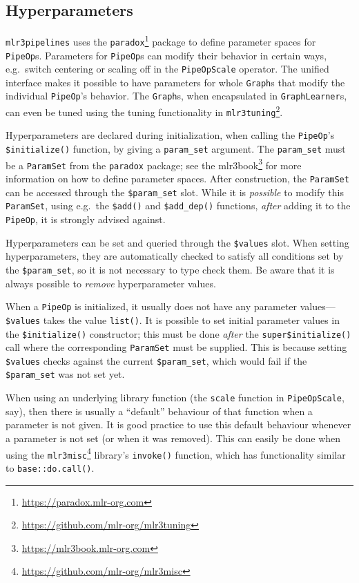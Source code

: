 \documentclass[12pt,]{scrbook}
\renewcommand{\href}[2]{#2\footnote{\url{#1}}}
\begin{document}
\hypertarget{ext-pipe-hyperpars}{%
\subsection{Hyperparameters}\label{ext-pipe-hyperpars}}

\texttt{mlr3pipelines} uses the \href{https://paradox.mlr-org.com}{\texttt{paradox}} package to define parameter spaces for \texttt{PipeOp}s.
Parameters for \texttt{PipeOp}s can modify their behavior in certain ways, e.g.~switch centering or scaling off in the \texttt{PipeOpScale} operator.
The unified interface makes it possible to have parameters for whole \texttt{Graph}s that modify the individual \texttt{PipeOp}'s behavior.
The \texttt{Graph}s, when encapsulated in \texttt{GraphLearner}s, can even be tuned using the tuning functionality in \href{https://github.com/mlr-org/mlr3tuning}{\texttt{mlr3tuning}}.

Hyperparameters are declared during initialization, when calling the \texttt{PipeOp}'s \texttt{\$initialize()} function, by giving a \texttt{param\_set} argument.
The \texttt{param\_set} must be a \texttt{ParamSet} from the \texttt{paradox} package; see the \href{https://mlr3book.mlr-org.com}{mlr3book} for more information on how to define parameter spaces.
After construction, the \texttt{ParamSet} can be accessed through the \texttt{\$param\_set} slot.
While it is \emph{possible} to modify this \texttt{ParamSet}, using e.g.~the \texttt{\$add()} and \texttt{\$add\_dep()} functions, \emph{after} adding it to the \texttt{PipeOp}, it is strongly advised against.

Hyperparameters can be set and queried through the \texttt{\$values} slot.
When setting hyperparameters, they are automatically checked to satisfy all conditions set by the \texttt{\$param\_set}, so it is not necessary to type check them.
Be aware that it is always possible to \emph{remove} hyperparameter values.

When a \texttt{PipeOp} is initialized, it usually does not have any parameter values---\texttt{\$values} takes the value \texttt{list()}.
It is possible to set initial parameter values in the \texttt{\$initialize()} constructor; this must be done \emph{after} the \texttt{super\$initialize()} call where the corresponding \texttt{ParamSet} must be supplied.
This is because setting \texttt{\$values} checks against the current \texttt{\$param\_set}, which would fail if the \texttt{\$param\_set} was not set yet.

When using an underlying library function (the \texttt{scale} function in \texttt{PipeOpScale}, say), then there is usually a ``default'' behaviour of that function when a parameter is not given.
It is good practice to use this default behaviour whenever a parameter is not set (or when it was removed).
This can easily be done when using the \href{https://github.com/mlr-org/mlr3misc}{\texttt{mlr3misc}} library's \texttt{invoke()} function, which has functionality similar to \texttt{base::do.call()}.
\end{document}

